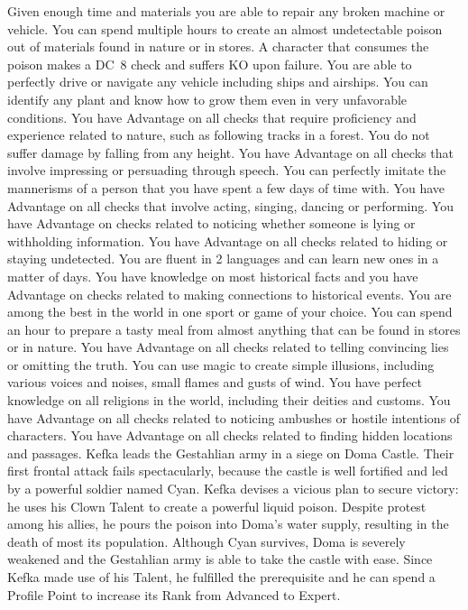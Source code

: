 \documentclass[a4paper, titlepage, 11pt, twocolumn] {article}
\begin{document}
{Given enough time and materials you are able to repair any broken machine or vehicle.}
\ofrow
{}
{You can spend multiple hours to create an almost undetectable poison out of materials found in nature or in stores. A character that consumes the poison makes a DC~8 check and suffers KO upon failure.}
\ofrow
{}
{You are able to perfectly drive or navigate any vehicle including ships and airships. }
\newpage
{} 
{You can identify any plant and know how to grow them even in very unfavorable conditions.}
\ofrow
{}
{You have Advantage on all checks that require proficiency and experience related to nature, such as following tracks in a forest.}
\ofrow
{} 
{You do not suffer damage by falling from any height.}
\ofrow
{}
{You have Advantage on all checks that involve impressing or persuading through speech.}
\ofrow
{}
{You can perfectly imitate the mannerisms of a person that you have spent a few days of time with.}
\ofrow
{}
{You have Advantage on all checks that involve acting, singing, dancing or performing.}
\ofrow
{}
{You have Advantage on checks related to noticing whether someone is lying or withholding information.}
\ofrow
{} 
{You have Advantage on all checks related to hiding or staying undetected.}
\ofrow
{}
{You are fluent in 2 languages and can learn new ones in a matter of days.}
\ofrow
{}
{You have knowledge on most historical facts and you have Advantage on checks related to making connections to historical events.}
\ofrow
{}
{You are among the best in the world in one sport or game of your choice.}
\ofrow
{}
{You can spend an hour to prepare a tasty meal from almost anything that can be found in stores or in nature.}
\ofrow
{}
{You have Advantage on all checks related to telling convincing lies or omitting the truth.}
\ofrow
{}
{You can use magic to create simple illusions, including various voices and noises, small flames and gusts of wind.}
\ofrow
{}
{You have perfect knowledge on all religions in the world, including their deities and customs.}
\ofrow
{}
{You have Advantage on all checks related to noticing ambushes or hostile intentions of characters.}
\ofrow
{}
{You have Advantage on all checks related to finding hidden locations and passages.}
%
\vfill
%
{
	Kefka leads the Gestahlian army in a siege on Doma Castle.
	Their first frontal attack fails spectacularly, because the castle is well fortified and led by a powerful soldier named Cyan.
	Kefka devises a vicious plan to secure victory: he uses his Clown Talent to create a powerful liquid poison.
	Despite protest among his allies, he pours the poison into Doma's water supply, resulting in the death of most its population.
	Although Cyan survives, Doma is severely weakened and the Gestahlian army is able to take the castle with ease.
	Since Kefka made use of his Talent, he fulfilled the prerequisite and he can spend a Profile Point to increase its Rank from Advanced to Expert.
}	
\end{document}
